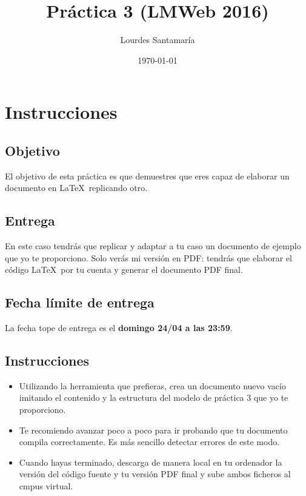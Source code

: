 \documentclass{article}
\title{Práctica 3 (LMWeb 2016)}
\author{Lourdes Santamaría}
\date{\today}
\begin{document}
\maketitle

\section{Instrucciones}

\subsection{Objetivo}

El objetivo de esta práctica es que demuestres que eres capaz de elaborar un documento en \LaTeX\ replicando otro.

\subsection{Entrega}

En este caso tendrás que replicar y adaptar a tu caso un documento de ejemplo que yo te proporciono. Solo verás mi versión en PDF: tendrás que elaborar el código \LaTeX\ por tu cuenta y generar el documento PDF final.

\subsection{Fecha límite de entrega}

La fecha tope de entrega es el \textbf{domingo 24/04 a las 23:59}.

\subsection{Instrucciones}

\begin{itemize}

\item Utilizando la herramienta que prefieras, crea un documento nuevo vacío imitando el contenido y la estructura del modelo de práctica 3 que yo te proporciono.

\item Te recomiendo avanzar poco a poco para ir probando que tu documento compila correctamente. Es más sencillo detectar errores de este modo.

\item Cuando hayas terminado, descarga de manera local en tu ordenador la versión del código fuente y tu versión PDF final y sube ambos ficheros al cmpus virtual.

\end{itemize}
\end{document}
